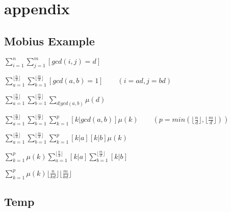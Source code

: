 \appendix


\chapter{appendix}

\section{Mobius Example}
  $ \displaystyle\sum_{i=1}^n \sum_{j=1}^m [gcd(i, j) = d] $

  $ \displaystyle\sum_{a=1}^{\lfloor \frac n d \rfloor} \sum_{b=1}^{\lfloor \frac m d \rfloor} [gcd(a, b) = 1] \qquad (i = ad, j = bd) $

  $ \displaystyle\sum_{a=1}^{\lfloor \frac n d \rfloor} \sum_{b=1}^{\lfloor \frac m d \rfloor} \sum_{d|gcd(a, b)} \mu (d) $

  $ \displaystyle\sum_{a=1}^{\lfloor \frac n d \rfloor} \sum_{b=1}^{\lfloor \frac m d \rfloor} \sum_{k=1}^p [k|gcd(a, b)] \mu (k) \qquad (p = min(\lfloor \frac n d \rfloor, \lfloor \frac m d \rfloor)) $

  $ \displaystyle\sum_{a=1}^{\lfloor \frac n d \rfloor} \sum_{b=1}^{\lfloor \frac m d \rfloor} \sum_{k=1}^p [k|a][k|b] \mu (k) $

  $ \displaystyle\sum_{k=1}^p \mu (k) \sum_{a=1}^{\lfloor \frac n d \rfloor} [k|a] \sum_{b=1}^{\lfloor \frac m d \rfloor} [k|b] $

  $ \displaystyle\sum_{k=1}^p \mu (k) \lfloor \frac n {kd} \rfloor \lfloor \frac m {kd} \rfloor $

\section{Temp}
